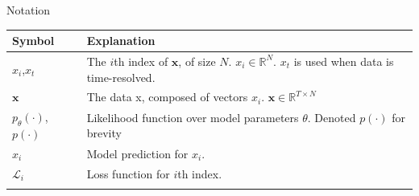\documentclass[
  ignorenonframetext,
  aspectratio=169,
]{beamer}
\begin{document}
\begin{frame}{Notation}
\protect\hypertarget{notation}{}
\begin{longtable}[]{@{}ll@{}}
\toprule
\begin{minipage}[b]{0.32\columnwidth}\raggedright
Symbol\strut
\end{minipage} & \begin{minipage}[b]{0.62\columnwidth}\raggedright
Explanation\strut
\end{minipage}\tabularnewline
\midrule
\endhead
\begin{minipage}[t]{0.32\columnwidth}\raggedright
\(x_i\),\(x_t\)\strut
\end{minipage} & \begin{minipage}[t]{0.62\columnwidth}\raggedright
The \(i\)th index of \(\mathbf{x}\), of size \(N\).
\(x_i \in \mathbb{R}^N\). \(x_t\) is used when data is
time-resolved.\strut
\end{minipage}\tabularnewline
\begin{minipage}[t]{0.32\columnwidth}\raggedright
\(\mathbf{x}\)\strut
\end{minipage} & \begin{minipage}[t]{0.62\columnwidth}\raggedright
The data x, composed of vectors \(x_i\).
\(\mathbf{x} \in \mathbb{R}^{T \times N}\)\strut
\end{minipage}\tabularnewline
\begin{minipage}[t]{0.32\columnwidth}\raggedright
\(p_\theta(\cdot )\), \(p(\cdot )\)\strut
\end{minipage} & \begin{minipage}[t]{0.62\columnwidth}\raggedright
Likelihood function over model parameters \(\theta\). Denoted
\(p(\cdot )\) for brevity\strut
\end{minipage}\tabularnewline
\begin{minipage}[t]{0.32\columnwidth}\raggedright
\(\hat{x}_i\)\strut
\end{minipage} & \begin{minipage}[t]{0.62\columnwidth}\raggedright
Model prediction for \(x_i\).\strut
\end{minipage}\tabularnewline
\begin{minipage}[t]{0.32\columnwidth}\raggedright
\(\mathcal{L}_{i}\)\strut
\end{minipage} & \begin{minipage}[t]{0.62\columnwidth}\raggedright
Loss function for \(i\)th index.\strut
\end{minipage}\tabularnewline
\begin{minipage}[t]{0.32\columnwidth}\raggedright

\end{minipage}
\end{longtable}
\end{frame}
\end{document}
